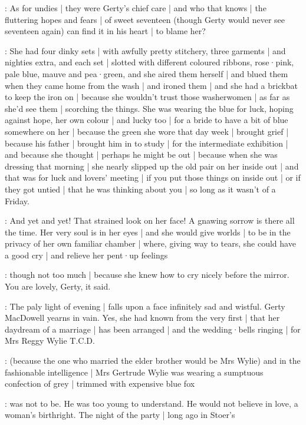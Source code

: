 :
As for undies |
they were Gerty's chief care |
and who that knows |
the fluttering hopes and fears |
of sweet seventeen
(though Gerty would never see seventeen again)
can find it in his heart |
to blame her?

\gertyReal:
She had four dinky sets |
with awfully pretty stitchery,
three garments |
and nighties extra,
and each set |
slotted with different coloured ribbons,
rose·pink,
pale blue,
mauve
and pea·green,
and she aired them herself |
and blued them
when they came home from the wash |
and ironed them |
and she had a brickbat to keep the iron on |
because she wouldn't trust those washerwomen |
as far as she'd see them |
scorching the things.
She was wearing the blue for luck,
hoping against hope,%
her own colour |
and lucky too |
for a bride to have a bit of blue somewhere on her |
because the green she wore that day week |
brought grief |
because his father |
brought him in to study |
for the intermediate exhibition |
and because she thought |
perhaps he might be out |
because when she was dressing that morning |
she nearly slipped up the old pair on her inside out |
and that was for luck and lovers' meeting |
if you put those things on inside out |
or if they got untied |
that he was thinking about you |
so long as it wasn't of a Friday.

\gertyNovel:
And yet and yet!
That strained look on her face!
A gnawing sorrow is there all the time.
Her very soul is in her eyes |
and she would give worlds |
to be in the privacy of her own familiar chamber |
where,
giving way to tears,
she could have a good cry |
and relieve her pent·up feelings

\gertyReal:
though not too much |
because she knew how to cry nicely before the mirror.
You are lovely,
Gerty,
it said.

\gertyNovel:
The paly light of evening |
falls upon a face infinitely sad and wistful.
Gerty MacDowell yearns in vain.
Yes,
she had known from the very first |
that her daydream of a marriage |
has been arranged |
and the wedding·bells ringing |
for Mrs Reggy Wylie T.C.D.

\gertyReal:
(because the one who married the elder brother
would be Mrs Wylie)
and in the fashionable intelligence |
Mrs Gertrude Wylie was wearing a sumptuous confection of grey |
trimmed with expensive blue fox

\gertyNovel:
was not to be.
He was too young to understand.
He would not believe in love,
a woman's birthright.
The night of the party |
long ago in Stoer's

